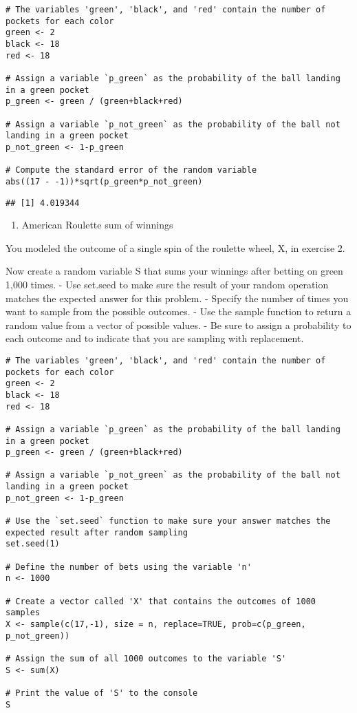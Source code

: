 \documentclass[
]{article}
\providecommand{\tightlist}{%
  \setlength{\itemsep}{0pt}\setlength{\parskip}{0pt}}
\begin{document}
\begin{verbatim}
# The variables 'green', 'black', and 'red' contain the number of pockets for each color
green <- 2
black <- 18
red <- 18

# Assign a variable `p_green` as the probability of the ball landing in a green pocket
p_green <- green / (green+black+red)

# Assign a variable `p_not_green` as the probability of the ball not landing in a green pocket
p_not_green <- 1-p_green

# Compute the standard error of the random variable
abs((17 - -1))*sqrt(p_green*p_not_green)
\end{verbatim}

\begin{verbatim}
## [1] 4.019344
\end{verbatim}

\begin{enumerate}
\def\labelenumi{\arabic{enumi}.}
\setcounter{enumi}{4}
\tightlist
\item
  American Roulette sum of winnings
\end{enumerate}

You modeled the outcome of a single spin of the roulette wheel, X, in
exercise 2.

Now create a random variable S that sums your winnings after betting on
green 1,000 times. - Use set.seed to make sure the result of your random
operation matches the expected answer for this problem. - Specify the
number of times you want to sample from the possible outcomes. - Use the
sample function to return a random value from a vector of possible
values. - Be sure to assign a probability to each outcome and to
indicate that you are sampling with replacement.

\begin{verbatim}
# The variables 'green', 'black', and 'red' contain the number of pockets for each color
green <- 2
black <- 18
red <- 18

# Assign a variable `p_green` as the probability of the ball landing in a green pocket
p_green <- green / (green+black+red)

# Assign a variable `p_not_green` as the probability of the ball not landing in a green pocket
p_not_green <- 1-p_green

# Use the `set.seed` function to make sure your answer matches the expected result after random sampling
set.seed(1)

# Define the number of bets using the variable 'n'
n <- 1000

# Create a vector called 'X' that contains the outcomes of 1000 samples
X <- sample(c(17,-1), size = n, replace=TRUE, prob=c(p_green, p_not_green))

# Assign the sum of all 1000 outcomes to the variable 'S'
S <- sum(X)

# Print the value of 'S' to the console
S
\end{verbatim}
\end{document}
